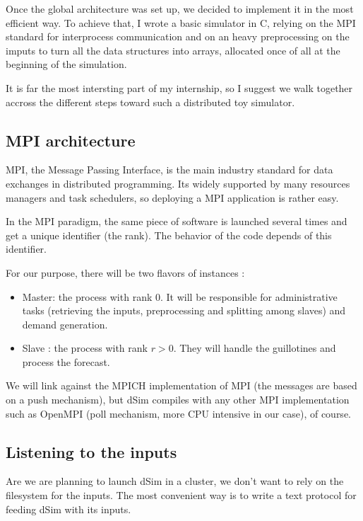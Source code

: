 \documentclass[11pt]{JHEP3}
\begin{document}
Once the global architecture was set up, we decided to implement it in
the most efficient way. To achieve that, I wrote a basic simulator in
C, relying on the MPI standard for interprocess communication and on
an heavy preprocessing on the imputs to turn all the data structures
into arrays, allocated once of all at the beginning of the simulation.

It is far the most intersting part of my internship, so I suggest we
walk together accross the different steps toward such a distributed
toy simulator.

\subsection{MPI architecture}

MPI, the Message Passing Interface, is the main industry standard for
data exchanges in distributed programming. Its widely supported by
many resources managers and task schedulers, so deploying a MPI
application is rather easy.

In the MPI paradigm, the same piece of software is launched several
times and get a unique identifier (the rank). The behavior of the code
depends of this identifier.

For our purpose, there will be two flavors of instances :

\begin{itemize}
\item Master: the process with rank 0. It will be responsible for
  administrative tasks (retrieving the inputs, preprocessing and
  splitting among slaves) and demand generation.
\item Slave : the process with rank $r > 0$. They will handle the
  guillotines and process the forecast.
\end{itemize}

We will link against the MPICH implementation of MPI (the messages are
based on a push mechanism), but dSim compiles with any other MPI
implementation such as OpenMPI (poll mechanism, more CPU intensive in
our case), of course.

\subsection{Listening to the inputs}

Are we are planning to launch dSim in a cluster, we don't want to rely
on the filesystem for the inputs. The most convenient way is to write
a text protocol for feeding dSim with its inputs.
\end{document}
